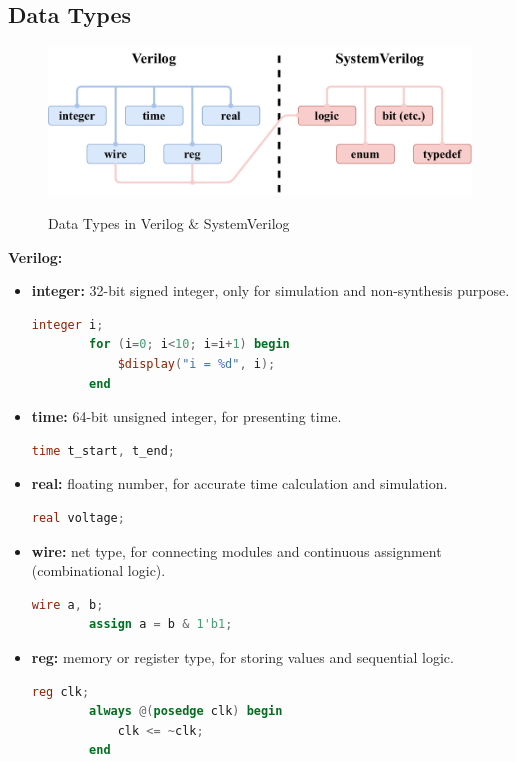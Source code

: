 \documentclass{article}
\begin{document}
\subsection{Data Types}
\begin{figure}[h]
    \centering
    \includegraphics[width=\textwidth]{figures/DataType.pdf}
    \label{fig:DataType}
    \caption{Data Types in Verilog \& SystemVerilog}
\end{figure}
\textbf{Verilog:}
\begin{itemize}
    \item \textbf{integer:} 32-bit signed integer, only for simulation and non-synthesis purpose.
    \begin{lstlisting}[language=Verilog,frame=single,backgroundcolor=\color{White},basicstyle=\color{LightGreen},showspaces=false,showstringspaces=false]
        integer i;
        for (i=0; i<10; i=i+1) begin
            $display("i = %d", i);
        end
    \end{lstlisting}
    \item \textbf{time:} 64-bit unsigned integer, for presenting time.
    \begin{lstlisting}[language=Verilog,frame=single,backgroundcolor=\color{White},basicstyle=\color{LightGreen},showspaces=false,showstringspaces=false]
        time t_start, t_end;
    \end{lstlisting}
    \item \textbf{real:} floating number, for accurate time calculation and simulation.
    \begin{lstlisting}[language=Verilog,frame=single,backgroundcolor=\color{White},basicstyle=\color{LightGreen},showspaces=false,showstringspaces=false]
        real voltage;
    \end{lstlisting}
    \item \textbf{wire:} net type, for connecting modules and continuous assignment (combinational logic).
    \begin{lstlisting}[language=Verilog,frame=single,backgroundcolor=\color{White},basicstyle=\color{LightGreen},showspaces=false,showstringspaces=false]
        wire a, b;
        assign a = b & 1'b1;
    \end{lstlisting}
    \item \textbf{reg:} memory or register type, for storing values and sequential logic.
    \begin{lstlisting}[language=Verilog,frame=single,backgroundcolor=\color{White},basicstyle=\color{LightGreen},showspaces=false,showstringspaces=false]
        reg clk;
        always @(posedge clk) begin
            clk <= ~clk;
        end
    \end{lstlisting}
\end{itemize}
\end{document}
